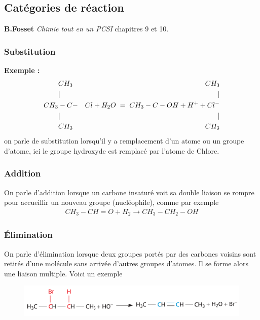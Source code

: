 \documentclass[12pt,prb,aps,epsf]{article}
\begin{document}
\subsection{Catégories de réaction}
\textbf{B.Fosset} \textit{Chimie tout en un PCSI} chapitres 9 et 10.

\subsubsection{Substitution}
\textbf{Exemple : }
\begin{eqnarray}
&CH_3&\hspace{3.8cm} CH_3\\
&|& \hspace{4.1cm} | \\
CH_3&-C-&Cl + H_2O \; = \; CH_3-C-OH + H^++Cl^- \\
&|&\hspace{4.1cm} |\\
&CH_3&\hspace{3.8cm} CH_3
\end{eqnarray}
on parle de substitution lorsqu'il y a remplacement d'un atome ou un groupe d'atome, ici le groupe hydroxyde est remplacé par l'atome de Chlore. %

\subsubsection{Addition}
On parle d'addition lorsque un carbone insaturé voit sa double liaison se rompre pour accueillir un nouveau groupe (nucléophile), comme par exemple
\begin{eqnarray}
CH_3-CH=O + H_2 \longrightarrow CH_3-CH_2-OH
\end{eqnarray}

\subsubsection{Élimination}
On parle d'élimination lorsque deux groupes portés par des carbones voisins sont retirés d’une molécule sans arrivée d’autres
groupes d’atomes. Il se forme alors une liaison multiple. Voici un exemple

\begin{figure}[h]
\centering \includegraphics[width=15cm]{elimination.png}
\end{figure}
\end{document}
